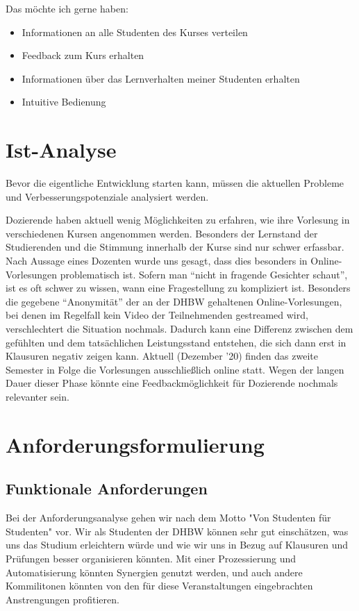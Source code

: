 Das möchte ich gerne haben:
\begin{itemize}
	\item Informationen an alle Studenten des Kurses verteilen
	\item Feedback zum Kurs erhalten
	\item Informationen über das Lernverhalten meiner Studenten erhalten
	\item Intuitive Bedienung
\end{itemize}

\section{Ist-Analyse}
Bevor die eigentliche Entwicklung starten kann, müssen die aktuellen Probleme und Verbesserungspotenziale analysiert werden.

Dozierende haben aktuell wenig Möglichkeiten zu erfahren, wie ihre Vorlesung in verschiedenen Kursen angenommen werden.
Besonders der Lernstand der Studierenden und die Stimmung innerhalb der Kurse sind nur schwer erfassbar.
Nach Aussage eines Dozenten wurde uns gesagt, dass dies besonders in Online-Vorlesungen problematisch ist.
Sofern man \enquote{nicht in fragende Gesichter schaut}, ist es oft schwer zu wissen, wann eine Fragestellung zu kompliziert ist.
Besonders die gegebene \enquote{Anonymität} der an der DHBW gehaltenen Online-Vorlesungen, bei denen im Regelfall kein Video der Teilnehmenden gestreamed wird, verschlechtert die Situation nochmals.
Dadurch kann eine Differenz zwischen dem gefühlten und dem tatsächlichen Leistungsstand entstehen, die sich dann erst in Klausuren negativ zeigen kann.
Aktuell (Dezember '20) finden das zweite Semester in Folge die Vorlesungen ausschließlich online statt. Wegen  der langen Dauer dieser Phase könnte eine Feedbackmöglichkeit für Dozierende nochmals relevanter sein.

\section{Anforderungsformulierung}

\subsection{Funktionale Anforderungen}
Bei der Anforderungsanalyse gehen wir nach dem Motto "Von Studenten für Studenten" vor. Wir als Studenten der DHBW können sehr gut einschätzen, was uns das Studium erleichtern würde und wie wir uns in Bezug auf Klausuren und Prüfungen besser organisieren könnten. Mit einer Prozessierung und Automatisierung könnten Synergien genutzt werden, und auch andere Kommilitonen könnten von den für diese Veranstaltungen eingebrachten Anstrengungen profitieren.

